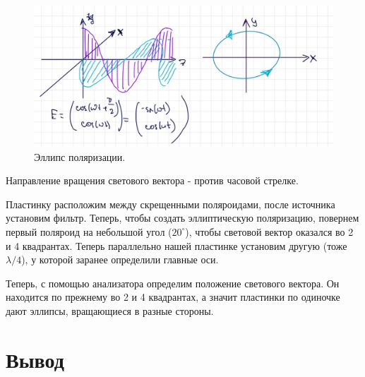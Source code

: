 \documentclass[a4paper,12pt]{article}
\begin{document}
	\begin{figure}[h!]
    \centering
    \includegraphics[scale = 0.3]{el.jpg}
    \caption{Эллипс поляризации.}
    \label{fig : 1}
\end{figure}

Направление вращения светового вектора - против часовой стрелке.
	
	Пластинку расположим между скрещенными поляроидами, после источника установим фильтр. Теперь, чтобы создать эллиптическую поляризацию, повернем первый поляроид на небольшой угол ($20^\circ$), чтобы световой вектор оказался во 2 и 4 квадрантах. Теперь параллельно нашей пластинке установим другую (тоже $\lambda/4$), у которой заранее определили главные оси.
	
	Теперь, с помощью анализатора определим положение светового вектора. Он находится по прежнему во 2 и 4 квадрантах, а значит пластинки по одиночке дают эллипсы, вращающиеся в разные стороны.
	



\section{Вывод}
\end{document}
